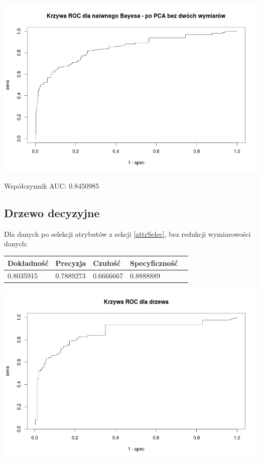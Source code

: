 \documentclass{article}
\begin{document}
\begin{center}
	\includegraphics[scale=0.40]{images/bayes2.png}
\end{center}

Współczynnik AUC: 0.8450985

\subsection{Drzewo decyzyjne}

Dla danych po selekcji atrybutów z sekcji \ref{attrSelec}, bez redukcji wymiarowości danych:

\begin{center}
    \begin{tabular}{| l | l | l | l | l|}
    \hline
        Dokładność &  Precyzja &  Czułość & Specyficzność \\ \hline
      	0.8035915 & 0.7889273 & 0.6666667 & 0.8888889 \\
    \hline
    \end{tabular}
\end{center}

\begin{center}
	\includegraphics[scale=0.40]{images/treeNoPCA.png}
\end{center}
\end{document}
